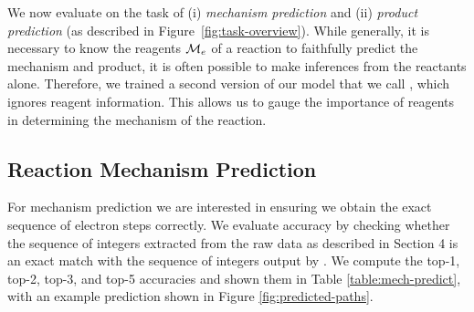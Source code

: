 We now evaluate \ourModelR on the task of (i) \emph{mechanism prediction} and (ii) \emph{product prediction} (as described in Figure~\ref{fig:task-overview}). While generally, it is necessary to know the reagents ${\mathcal{M}}_e$ of a reaction to faithfully predict the mechanism and product, it is often possible to make inferences from the reactants alone. Therefore, we trained a second version of our model that we call \ourModelIR, which ignores reagent information. This allows us 
to gauge the importance of reagents in determining the mechanism of the reaction. %





\subsection{Reaction Mechanism Prediction}

For mechanism prediction we are interested in ensuring we obtain the exact sequence of electron steps correctly. 
We evaluate accuracy by checking whether the sequence of integers extracted from the raw data as described in Section 4
is an exact match with the sequence of integers output by \ourModel. We compute the top-1, top-2, top-3, and top-5 accuracies and shown them in Table \ref{table:mech-predict}, with an example prediction shown in Figure \ref{fig:predicted-paths}.



